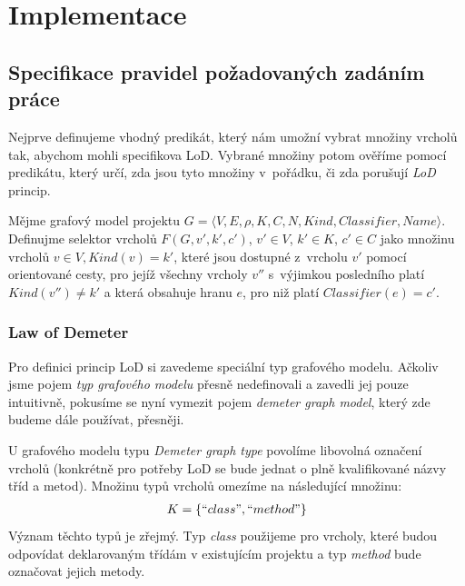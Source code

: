 \chapter{Implementace}


\section{Specifikace pravidel požadovaných zadáním práce}
Nejprve definujeme vhodný predikát, který nám umožní vybrat množiny vrcholů tak, abychom mohli specifikova LoD. Vybrané množiny potom ověříme pomocí predikátu, který určí, zda jsou tyto množiny v~pořádku, či zda porušují \emph{LoD} princip.

\begin{definition}
Mějme grafový model projektu $G = \langle V, E, \rho, K, C, N, \mathit{Kind}, \mathit{Classifier}, \mathit{Name}\rangle$. Definujme selektor vrcholů $F(G, v', k', c')$, $v' \in V$, $k' \in K$, $c' \in C$ jako množinu vrcholů $v \in V, Kind(v) = k'$, které jsou dostupné z~vrcholu $v'$ pomocí orientované cesty, pro jejíž všechny vrcholy $v''$ s~výjimkou posledního platí $Kind(v'') \ne k'$ a která obsahuje hranu $e$, pro niž platí $Classifier(e) = c' $.
\end{definition}

\subsection{Law of Demeter}
\label{implementation-lod_specification}
Pro definici princip LoD si zavedeme speciální typ grafového modelu. Ačkoliv jsme pojem \emph{typ grafového modelu}  přesně nedefinovali a zavedli jej pouze intuitivně, pokusíme se nyní vymezit pojem \emph{demeter graph model}, který zde budeme dále používat, přesněji.

U grafového modelu typu \emph{Demeter graph type} povolíme libovolná označení vrcholů (konkrétně pro potřeby LoD se bude jednat o plně kvalifikované názvy tříd a metod). Množinu typů vrcholů omezíme na následující množinu:
\begin{align*}
K = \{ ``class", ``method" \}
\end{align*}
Význam těchto typů je zřejmý. Typ \emph{class} použijeme pro vrcholy, které budou odpovídat deklarovaným třídám v existujícím projektu a typ \emph{method} bude označovat jejich metody.

